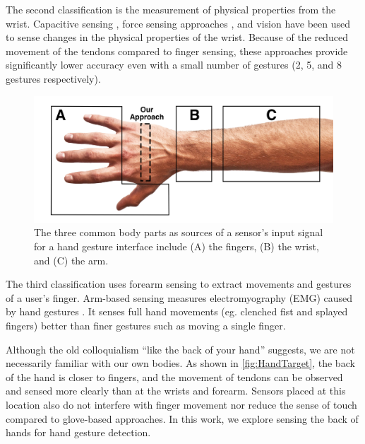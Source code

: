 \documentclass{sigchi}
\begin{document}
The second classification is the measurement of physical properties from the wrist. Capacitive sensing \cite{Rekimoto:2001:GGU:580581.856565}, force sensing approaches \cite{Dementyev:2014:WLG:2642918.2647396}, and vision \cite{Fukui:2011:HSC:2030112.2030154} have been used to sense changes in the physical properties of the wrist. Because of the reduced movement of the tendons compared to finger sensing, these approaches provide significantly lower accuracy even with a small number of gestures (2, 5, and 8 gestures respectively).

\begin{figure}[b]
  \begin{center}
  \includegraphics[width=1\columnwidth]{figures/HandTarget.jpg}
  \caption{The three common body parts as sources of a sensor's input signal for a hand gesture interface include (A) the fingers, (B) the wrist, and (C) the arm.}
  \label{fig:HandTarget}
  \end{center}
\end{figure}

The third classification uses forearm sensing to extract movements and gestures of a user's finger. Arm-based sensing measures electromyography (EMG) caused by hand gestures \cite{Myo, Saponas:2009:EAI:1622176.1622208}. It senses full hand movements (eg. clenched fist and splayed fingers) better than finer gestures such as moving a single finger.

Although the old colloquialism ``like the back of your hand'' suggests, we are not necessarily familiar with our own bodies. As shown in \autoref{fig:HandTarget}, the back of the hand is closer to fingers, and the movement of tendons can be observed and sensed more clearly than at the wrists and forearm. Sensors placed at this location also do not interfere with finger movement nor reduce the sense of touch compared to glove-based approaches. In this work, we explore sensing the back of hands for hand gesture detection.
\end{document}

